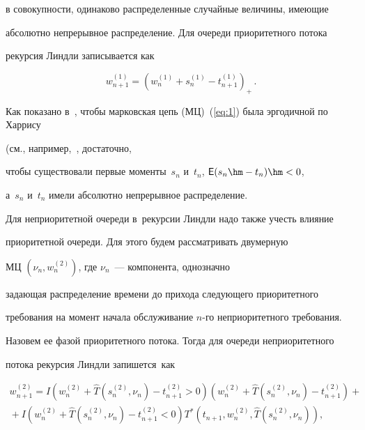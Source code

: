 в совокупности, одинаково распределенные случайные величины, имеющие

абсолютно непрерывное распределение. Для очереди приоритетного потока

рекурсия Линдли записывается как

\begin{equation}

w_{n+1}^{(1)}=\left(w_{n}^{(1)}+s_{n}^{(1)}-t_{n+1}^{(1)}\right)_{+}\,.

\label{eq:1} 

\end{equation}

Как показано в~\cite{2-mis}, чтобы марковская цепь (МЦ)~(\ref{eq:1}) была эргодичной по Харрису

(см., например,~\cite{3-mis, 4-mis}, достаточно,

чтобы существовали первые моменты~$s_{n}$ и~$t_{n}$, ${\sf E}(s_{n}\hm-t_{n})\hm<0$,

а~$s_{n}$ и~$t_{n}$ имели абсолютно непрерывное распределение.



Для неприоритетной очереди в~рекурсии Линдли надо также учесть влияние

приоритетной очереди. Для этого будем рассматривать двумерную 

МЦ $(\nu_{n},w_{n}^{(2)})$, где $\nu_{n}$~--- компонента, однозначно

задающая распределение времени до прихода следующего приоритетного

требования на момент начала обслуживание $n$-го неприоритетного требования.

Назовем ее фазой приоритетного потока. Тогда для очереди неприоритетного

потока рекурсия Линдли запишется~как

\begin{multline}

w_{n+1}^{(2)}=I\left(w_{n}^{(2)}+\hat{T}(s_{n}^{(2)},\nu_{n})-t_{n+1}^{(2)}>0\right)

\left(w_{n}^{(2)}+\hat{T}(s_{n}^{(2)},\nu_{n})-t_{n+1}^{(2)}\right)+{}\\

{}+I(w_{n}^{(2)}+\hat{T}(s_{n}^{(2)},\nu_{n})-t_{n+1}^{(2)}<0)

 T^{*}\left(t_{n+1},w_{n}^{(2)},\hat{T}(s_{n}^{(2)},\nu_{n})\right),

 \label{eq:2}

\end{multline}

